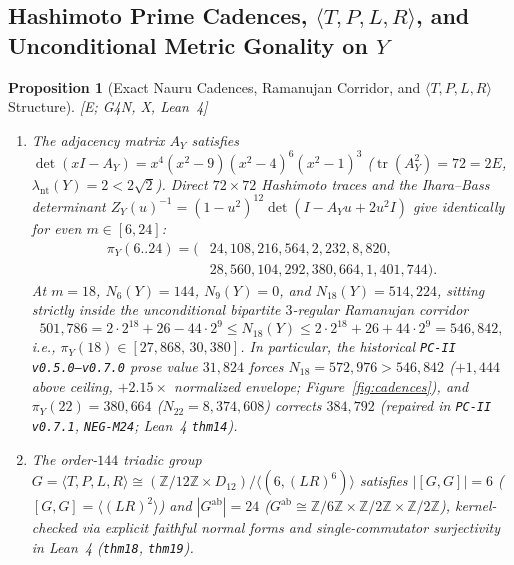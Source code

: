 \documentclass[11pt]{amsart}
\numberwithin{equation}{section}
\theoremstyle{plain}
\newtheorem{proposition}[theorem]{Proposition}
\theoremstyle{definition}\newtheorem{definition}[theorem]{Definition}
\theoremstyle{remark}\newtheorem{remark}[theorem]{Remark}
\newcommand{\Z}{\mathbb{Z}}
\newcommand{\ctag}[1]{\textup{\textsf{\scriptsize[#1]}}}
\begin{document}
\subsection{Hashimoto Prime Cadences, \texorpdfstring{$\langle T,P,L,R\rangle$}{<T,P,L,R>}, and Unconditional Metric Gonality on \texorpdfstring{$Y$}{Y}}\label{sec:nauru_cadences_gonality}
\begin{proposition}[Exact Nauru Cadences, Ramanujan Corridor, and $\langle T,P,L,R\rangle$ Structure]\label{prop:nauru_errata}
\ctag{E; G4N, X, Lean~4}
\begin{enumerate}[label=(\arabic*),nosep]
\item The adjacency matrix $A_Y$ satisfies $\det(xI - A_Y) = x^4(x^2-9)(x^2-4)^6(x^2-1)^3$ ($\operatorname{tr}(A_Y^2)=72=2E$, $\lambda_{\mathrm{nt}}(Y)=2<2\sqrt{2}$). Direct $72\times 72$ Hashimoto traces and the Ihara--Bass determinant $Z_Y(u)^{-1} = (1-u^2)^{12}\det(I - A_Y u + 2u^2 I)$ give identically for even $m\in[6,24]$:
\begin{equation}\label{eq:pi_Y}
\begin{aligned}
\pi_Y(6..24) = (&24, 108, 216, 564, 2{,}232, 8{,}820,\\
&28{,}560, 104{,}292, 380{,}664, 1{,}401{,}744).
\end{aligned}
\end{equation}
At $m=18$, $N_6(Y)=144$, $N_9(Y)=0$, and $N_{18}(Y)=514{,}224$, sitting strictly inside the unconditional bipartite $3$-regular Ramanujan corridor
\begin{equation}\label{eq:ram_corridor_18}
501{,}786 = 2\cdot 2^{18} + 26 - 44\cdot 2^9 \le N_{18}(Y) \le 2\cdot 2^{18} + 26 + 44\cdot 2^9 = 546{,}842,
\end{equation}
i.e., $\pi_Y(18)\in[27{,}868,\,30{,}380]$. In particular, the historical \texttt{PC-II v0.5.0--v0.7.0} prose value $31{,}824$ forces $N_{18}=572{,}976>546{,}842$ ($+1{,}444$ above ceiling, $+2.15\times$ normalized envelope; Figure~\ref{fig:cadences}), and $\pi_Y(22)=380{,}664$ ($N_{22}=8{,}374{,}608$) corrects $384{,}792$ (repaired in \texttt{PC-II v0.7.1}, \texttt{NEG-M24}; Lean~4 \texttt{thm14}).
\item The order-$144$ triadic group $G = \langle T, P, L, R\rangle \cong (\Z/12\Z \times D_{12})/\langle(6, (LR)^6)\rangle$ satisfies $|[G,G]| = 6$ ($[G,G] = \langle(LR)^2\rangle$) and $|G^{\mathrm{ab}}| = 24$ ($G^{\mathrm{ab}} \cong \Z/6\Z \times \Z/2\Z \times \Z/2\Z$), kernel-checked via explicit faithful normal forms and single-commutator surjectivity in Lean~4 (\texttt{thm18}, \texttt{thm19}).
\end{enumerate}
\end{proposition}
\end{document}
